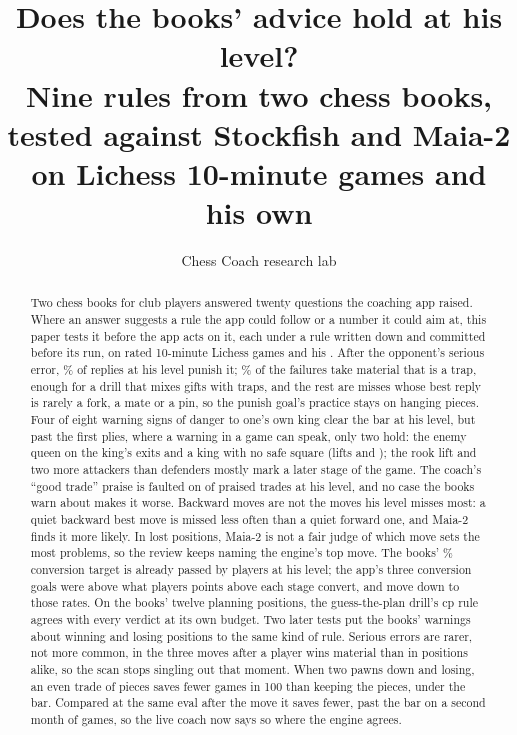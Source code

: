 \documentclass[11pt]{article}
\title{Does the books' advice hold at his level?\\[0.3em]
\large Nine rules from two chess books, tested against Stockfish and Maia-2 on Lichess 10-minute
games and his own}
\author{Chess Coach research lab}
\date{}
\begin{document}
\maketitle

\begin{abstract}
Two chess books for club players answered twenty questions the coaching app raised. Where an answer
suggests a rule the app could follow or a number it could aim at, this paper tests it before the app
acts on it, each under a rule written down and committed before its run, on \GamesRead{} rated
10-minute Lichess games and his \ArchiveGames. After the opponent's serious error, \OneAHisPunishedShare\% of
replies at his level punish it; \OneAHisTrapShare\% of the failures take material that is a trap, enough
for a drill that mixes gifts with traps, and the rest are misses whose best reply is rarely a fork, a
mate or a pin, so the punish goal's practice stays on hanging pieces. Four of eight warning signs of danger
to one's own king clear the bar at his level, but past the first \BookPlies{} plies, where a warning
in a game can speak, only two hold: the enemy queen on the king's exits and a king with no safe
square (lifts \KingLateQueenOnExits{} and \KingLateNoSafeSquares); the rook lift and two more attackers
than defenders mostly mark a later stage of the game. The coach's ``good trade'' praise is faulted
on \TradeHisFaulted{} of praised trades at his level, and no case the books warn about makes it
worse. Backward moves are not the moves his level misses most: a quiet backward best move is missed
less often than a quiet forward one, and Maia-2 finds it more likely. In lost positions, Maia-2 is not a fair judge of which move sets the most
problems, so the review keeps naming the engine's top move. The books' \BooksTarget\% conversion
target is already passed by players at his level; the app's three conversion goals were above what
players \LookAbove{} points above each stage convert, and move down to those rates. On the books'
twelve planning positions, the guess-the-plan drill's \PlanMargin{} cp rule agrees with every
verdict at its own budget. Two later tests put the books' warnings about winning and losing positions
to the same kind of rule. Serious errors are rarer, not more common, in the three moves after a
player wins material than in positions alike, so the scan stops singling out that moment. When two
pawns down and losing, an even trade of pieces saves \LostTradesBothDrop{} fewer games in 100 than
keeping the pieces, under the bar. Compared at the same eval after the move it saves
\LostTradesAugAfterDrop{} fewer, past the bar on a second month of games, so the live coach now says
so where the engine agrees.
\end{abstract}
\end{document}
